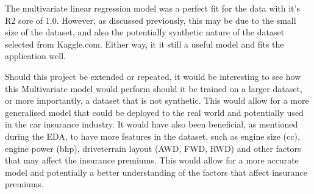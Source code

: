 \documentclass{article}
\begin{document}
The multivariate linear regression model was a perfect fit for the data with it's R2 sore of 1.0. However, as discussed previously, this may be due to the small size of the dataset, and also the potentially synthetic nature of the dataset selected from Kaggle.com. Either way, it it still a useful model and fits the application well.

Should this project be extended or repeated, it would be interesting to see how this Multivariate model would perform should it be trained on a larger dataset, or more importantly, a dataset that is not synthetic. This would allow for a more generalised model that could be deployed to the real world and potentially used in the car insurance industry. It would have also been beneficial, as mentioned during the EDA, to have more features in the dataset, such as engine size (cc), engine power (bhp), driveterrain layout (AWD, FWD, RWD) and other factors that may affect the insurance premiums. This would allow for a more accurate model and potentially a better understanding of the factors that affect insurance premiums.
\newpage

\printbibliography
\end{document}

